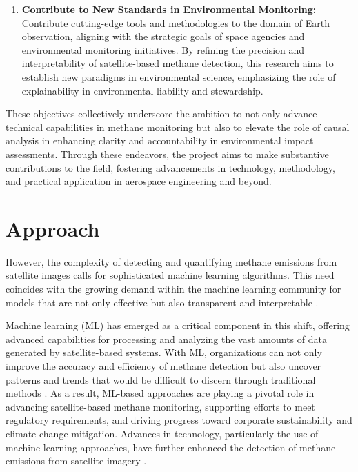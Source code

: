 \begin{enumerate}
    \item \textbf{Contribute to New Standards in Environmental Monitoring:} Contribute cutting-edge tools and methodologies to the domain of Earth observation, aligning with the strategic goals of space agencies and environmental monitoring initiatives. By refining the precision and interpretability of satellite-based methane detection, this research aims to establish new paradigms in environmental science, emphasizing the role of explainability in environmental liability and stewardship.
\end{enumerate}

These objectives collectively underscore the ambition to not only advance technical capabilities in methane monitoring but also to elevate the role of causal analysis in enhancing clarity and accountability in environmental impact assessments. Through these endeavors, the project aims to make substantive contributions to the field, fostering advancements in technology, methodology, and practical application in aerospace engineering and beyond.


\section{Approach}

However, the complexity of detecting and quantifying methane emissions from satellite images calls for sophisticated machine learning algorithms. This need coincides with the growing demand within the machine learning community for models that are not only effective but also transparent and interpretable \cite{roscher_explainable_2020, hall_review_2022}. 

Machine learning (ML) has emerged as a critical component in this shift, offering advanced capabilities for processing and analyzing the vast amounts of data generated by satellite-based systems. With ML, organizations can not only improve the accuracy and efficiency of methane detection \cite{groshenry_detecting_2022, gu_methane_2021} but also uncover patterns and trends that would be difficult to discern through traditional methods \cite{psomouli_methane_2023, lauvaux_global_2022, groshenry_detecting_2022}. As a result, ML-based approaches are playing a pivotal role in advancing satellite-based methane monitoring, supporting efforts to meet regulatory requirements, and driving progress toward corporate sustainability and climate change mitigation. Advances in technology, particularly the use of machine learning approaches, have further enhanced the detection of methane emissions from satellite imagery \cite{irakulis_loitxate_satellites_2022, maasakkers_using_2022, sherwin_single_blind_2023, joyce_using_2023, Prasad2020, wu2020deep, kumar_deep_2020}.


